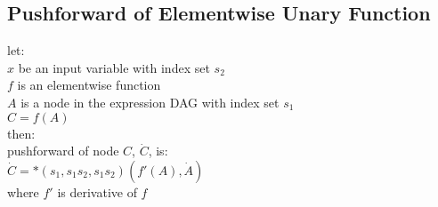 \documentclass[8pt]{extarticle}
\begin{document}
\begin{multicols*}{2}
  \vfill\null
  \columnbreak

  \subsection{Pushforward of Elementwise Unary Function}
  let:\\
  $x$ be an input variable with index set $s_2$\\
  $f$ is an elementwise function\\
  $A$ is a node in the expression DAG with index set $s_1$\\
  $C=f(A)$\\
  then:\\
  pushforward of node $C$, $\dot{C}$, is:\\
  $\dot{C} = *(s_1, s_1 s_2, s_1 s_2)(f'(A), \dot{A})$\\
  where $f'$ is derivative of $f$


\end{multicols*}
\end{document}
